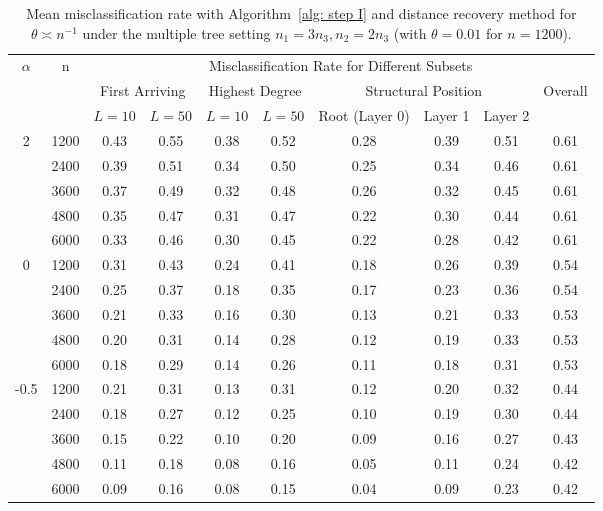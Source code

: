\documentclass[twoside,11pt]{article}
\theoremstyle{remark}
\begin{document}
\begin{table}[tbp]
\setlength{\tabcolsep}{3.5pt}

\centering

{
\begin{tabular}{c|c|cc|cc|ccc|c}
\hline
\hline
\multirow{3}{*}{$\alpha$} & \multirow{3}{*}{n}
& \multicolumn{8}{c}{Misclassification Rate for Different Subsets} \\
\cline{3-10}
& 
& \multicolumn{2}{c|}{First Arriving}
& \multicolumn{2}{c|}{Highest Degree}
& \multicolumn{3}{c|}{Structural Position}
& \multirow{2}{*}{Overall} \\
\cline{3-9}
& 
& $L=10$ & $L=50$
& $L=10$ & $L=50$
& Root (Layer 0) & Layer 1 & Layer 2
& \\
\hline
\multirow{5}{*}{2}
& 1200 & 0.43 & 0.55 & 0.38 & 0.52 & 0.28 & 0.39 & 0.51 & 0.61 \\
& 2400 & 0.39 & 0.51 & 0.34 & 0.50 & 0.25 & 0.34 & 0.46 & 0.61 \\
& 3600 & 0.37 & 0.49 & 0.32 & 0.48 & 0.26 & 0.32 & 0.45 & 0.61 \\
& 4800 & 0.35 & 0.47 & 0.31 & 0.47 & 0.22 & 0.30 & 0.44 & 0.61 \\
& 6000 & 0.33 & 0.46 & 0.30 & 0.45 & 0.22 & 0.28 & 0.42 & 0.61 \\
\hline
\multirow{5}{*}{0}
& 1200 & 0.31 & 0.43 & 0.24 & 0.41 & 0.18 & 0.26 & 0.39 & 0.54 \\
& 2400 & 0.25 & 0.37 & 0.18 & 0.35 & 0.17 & 0.23 & 0.36 & 0.54 \\
& 3600 & 0.21 & 0.33 & 0.16 & 0.30 & 0.13 & 0.21 & 0.33 & 0.53 \\
& 4800 & 0.20 & 0.31 & 0.14 & 0.28 & 0.12 & 0.19 & 0.33 & 0.53 \\
& 6000 & 0.18 & 0.29 & 0.14 & 0.26 & 0.11 & 0.18 & 0.31 & 0.53 \\
\hline
\multirow{5}{*}{-0.5}
& 1200 & 0.21 & 0.31 & 0.13 & 0.31 & 0.12 & 0.20 & 0.32 & 0.44 \\
& 2400 & 0.18 & 0.27 & 0.12 & 0.25 & 0.10 & 0.19 & 0.30 & 0.44 \\
& 3600 & 0.15 & 0.22 & 0.10 & 0.20 & 0.09 & 0.16 & 0.27 & 0.43 \\
& 4800 & 0.11 & 0.18 & 0.08 & 0.16 & 0.05 & 0.11 & 0.24 & 0.42 \\
& 6000 & 0.09 & 0.16 & 0.08 & 0.15 & 0.04 & 0.09 & 0.23 & 0.42 \\
\hline
\hline
\end{tabular}
}


\caption{Mean misclassification rate with Algorithm~\ref{alg: step I} and distance recovery method for $\theta \asymp n^{-1}$ under the multiple tree setting $n_1 = 3 n_3, n_2=2 n_3$ (with $\theta=0.01$ for $n=1200$).}
\label{tab:mean_error_scale_n1 3}
\end{table}
\end{document}
